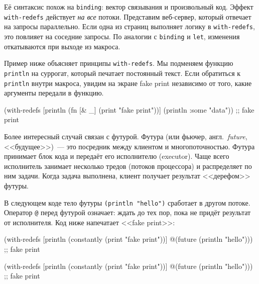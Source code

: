 \mnoindent
Её синтаксис похож на \verb|binding|: вектор связывания и произвольный
код. Эффект \verb|with-redefs| действует \emph{на все} потоки. Представим
веб-сервер, который отвечает на запросы параллельно. Если одна из страниц
выполняет логику в \verb|with-redefs|, это повлияет на соседние
запросы. По аналогии с \verb|binding| и \verb|let|, изменения откатываются при
выходе из макроса.

Пример ниже объясняет принципы \texttt{with\--redefs}. Мы подменяем функцию
\verb|println| на суррогат, который печатает постоянный текст. Если обратиться к
\verb|println| внутри макроса, увидим на экране fake print независимо от того,
какие аргументы передали в функцию.


\begin{english}
  \begin{clojure}
(with-redefs [println (fn [& _]
                        (print "fake print\n"))]
  (println {:some "data"}))
;; fake print
  \end{clojure}
\end{english}


Более интересный случай связан с футурой. Футура (или фьючер,
англ.~\emph{future}, <<будущее>>)~--- это посредник между клиентом и
многопоточностью. Футура принимает блок кода и передаёт его исполнителю
(executor). Чаще всего исполнитель занимает несколько тредов (потоков
процессора) и распределяет по ним задачи. Когда задача выполнена, клиент
получает результат <<дерефом>> футуры.

В следующем коде тело футуры \verb|(println "hello")| сработает в другом
потоке. Оператор \verb|@| перед футурой означает: ждать до тех пор, пока не
придёт результат от исполнителя. Код ниже напечатает <<fake print>>:


\ifnarrow

\begin{english}
  \begin{clojure}
(with-redefs
  [println (constantly
             (print "fake print"))]
  @(future (println "hello")))
;; fake print
  \end{clojure}
\end{english}

\else

\begin{english}
  \begin{clojure}
(with-redefs
  [println (constantly (print "fake print\n"))]
  @(future (println "hello")))
;; fake print
  \end{clojure}
\end{english}

